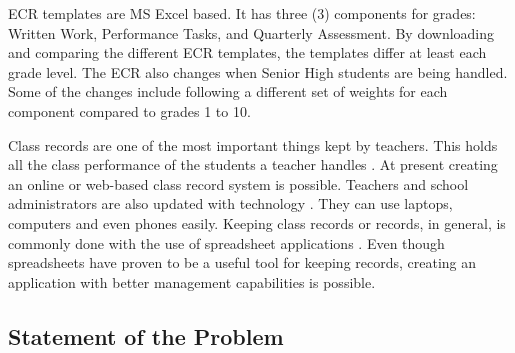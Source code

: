 \documentclass[11pt,a4paper,titlepage]{article}
\begin{document}
ECR templates are MS Excel based. It has three (3) components for grades: Written Work, Performance Tasks, and Quarterly Assessment. By downloading and comparing the different ECR templates, the templates differ at least each grade level. The ECR also changes when Senior High students are being handled. Some of the changes include following a different set of weights for each component compared to grades 1 to 10.

Class records are one of the most important things kept by teachers. This holds all the class performance of the students a teacher handles \cite{Dellosa}. At present creating an online or web-based class record system is possible. Teachers and school administrators are also updated with technology \cite{Dellosa}. They can use laptops, computers and even phones easily. Keeping class records or records, in general, is commonly done with the use of spreadsheet applications \cite{Dellosa}. Even though spreadsheets have proven to be a useful tool for keeping records, creating an application with better management capabilities is possible.

\subsection{Statement of the Problem}


\end{document}

